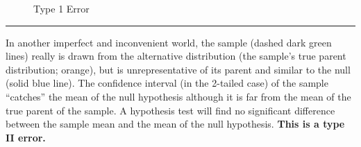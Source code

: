 \documentclass[
  letterpaper,
  DIV=11,
  numbers=noendperiod]{scrreprt}
\begin{document}
\begin{figure}


\caption{\label{fig-5-5.type1_error}Type 1 Error}

\end{figure}%

\begin{center}\rule{0.5\linewidth}{0.5pt}\end{center}

In another imperfect and inconvenient world, the sample (dashed dark
green lines) really is drawn from the alternative distribution (the
sample's true parent distribution; orange), but is unrepresentative of
its parent and similar to the null (solid blue line). The confidence
interval (in the 2-tailed case) of the sample ``catches'' the mean of
the null hypothesis although it is far from the mean of the true parent
of the sample. A hypothesis test will find no significant difference
between the sample mean and the mean of the null hypothesis.
\textbf{This is a type II error.}
\end{document}
